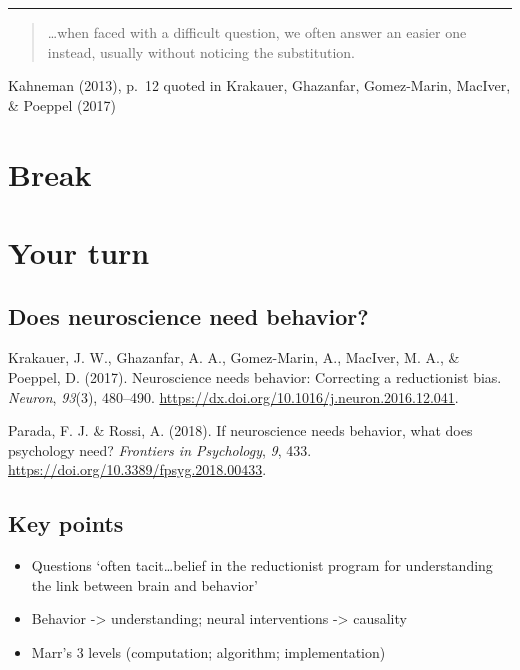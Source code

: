 \documentclass[
  letterpaper,
  DIV=11,
  numbers=noendperiod]{scrartcl}
\providecommand{\tightlist}{%
  \setlength{\itemsep}{0pt}\setlength{\parskip}{0pt}}\usepackage{longtable,booktabs,array}
\begin{document}
\begin{center}\rule{0.5\linewidth}{0.5pt}\end{center}

\begin{quote}
\ldots when faced with a difficult question, we often answer an easier
one instead, usually without noticing the substitution.
\end{quote}

Kahneman (2013), p.~12 quoted in Krakauer, Ghazanfar, Gomez-Marin,
MacIver, \& Poeppel (2017)

\section{Break}\label{break}

\section{Your turn}\label{your-turn}

\subsection{Does neuroscience need
behavior?}\label{does-neuroscience-need-behavior}

Krakauer, J. W., Ghazanfar, A. A., Gomez-Marin, A., MacIver, M. A., \&
Poeppel, D. (2017). Neuroscience needs behavior: Correcting a
reductionist bias. \emph{Neuron}, \emph{93}(3), 480--490.
\url{https://dx.doi.org/10.1016/j.neuron.2016.12.041}.

Parada, F. J. \& Rossi, A. (2018). If neuroscience needs behavior, what
does psychology need? \emph{Frontiers in Psychology}, \emph{9}, 433.
\url{https://doi.org/10.3389/fpsyg.2018.00433}.

\subsection{Key points}\label{key-points}

\begin{itemize}
\tightlist
\item
  Questions `often tacit\ldots belief in the reductionist program for
  understanding the link between brain and behavior'
\item
  Behavior -\textgreater{} understanding; neural interventions
  -\textgreater{} causality
\item
  Marr's 3 levels (computation; algorithm; implementation)
\end{itemize}
\end{document}

